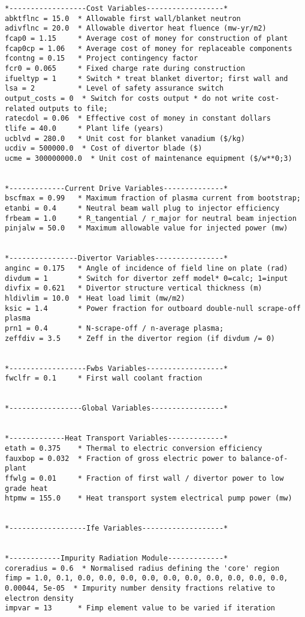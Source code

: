 \documentclass[11pt,a4paper]{report}
\begin{document}
\begin{verbatim}
*------------------Cost Variables------------------*
abktflnc = 15.0  * Allowable first wall/blanket neutron
adivflnc = 20.0  * Allowable divertor heat fluence (mw-yr/m2)
fcap0 = 1.15     * Average cost of money for construction of plant
fcap0cp = 1.06   * Average cost of money for replaceable components
fcontng = 0.15   * Project contingency factor
fcr0 = 0.065     * Fixed charge rate during construction
ifueltyp = 1     * Switch * treat blanket divertor; first wall and
lsa = 2          * Level of safety assurance switch
output_costs = 0  * Switch for costs output * do not write cost-related outputs to file;
ratecdol = 0.06  * Effective cost of money in constant dollars
tlife = 40.0     * Plant life (years)
ucblvd = 280.0   * Unit cost for blanket vanadium ($/kg)
ucdiv = 500000.0  * Cost of divertor blade ($)
ucme = 300000000.0  * Unit cost of maintenance equipment ($/w**0;3)


*-------------Current Drive Variables--------------*
bscfmax = 0.99   * Maximum fraction of plasma current from bootstrap;
etanbi = 0.4     * Neutral beam wall plug to injector efficiency
frbeam = 1.0     * R_tangential / r_major for neutral beam injection
pinjalw = 50.0   * Maximum allowable value for injected power (mw)


*----------------Divertor Variables----------------*
anginc = 0.175   * Angle of incidence of field line on plate (rad)
divdum = 1       * Switch for divertor zeff model* 0=calc; 1=input
divfix = 0.621   * Divertor structure vertical thickness (m)
hldivlim = 10.0  * Heat load limit (mw/m2)
ksic = 1.4       * Power fraction for outboard double-null scrape-off plasma
prn1 = 0.4       * N-scrape-off / n-average plasma;
zeffdiv = 3.5    * Zeff in the divertor region (if divdum /= 0)


*------------------Fwbs Variables------------------*
fwclfr = 0.1     * First wall coolant fraction


*-----------------Global Variables-----------------*


*-------------Heat Transport Variables-------------*
etath = 0.375    * Thermal to electric conversion efficiency
fauxbop = 0.032  * Fraction of gross electric power to balance-of-plant
ffwlg = 0.01     * Fraction of first wall / divertor power to low grade heat
htpmw = 155.0    * Heat transport system electrical pump power (mw)


*------------------Ife Variables-------------------*


*------------Impurity Radiation Module-------------*
coreradius = 0.6  * Normalised radius defining the 'core' region
fimp = 1.0, 0.1, 0.0, 0.0, 0.0, 0.0, 0.0, 0.0, 0.0, 0.0, 0.0, 0.0, 0.00044, 5e-05  * Impurity number density fractions relative to electron density
impvar = 13      * Fimp element value to be varied if iteration



\end{verbatim}
\end{document}
